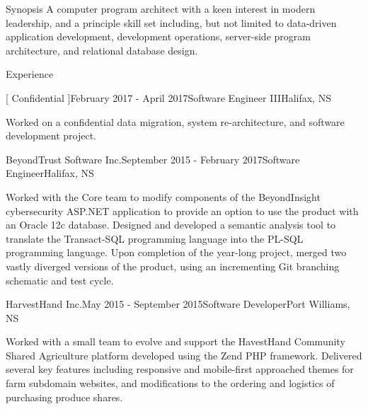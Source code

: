 \documentclass{resume} %
\begin{document}
\begin{rSection}{Synopsis}
A computer program architect with a keen interest in modern leadership, and a principle skill set
including, but not limited to data-driven application development, development operations, server-side
program architecture, and relational database design.
\end{rSection}



\begin{rSection}{Experience}


\begin{rSubsection}{[ Confidential ]}{February 2017 - April 2017}{Software Engineer III}{Halifax, NS}

\item[] Worked on a confidential data migration, system re-architecture, and software development project.

\end{rSubsection}


\begin{rSubsection}{BeyondTrust Software Inc.}{September 2015 - February 2017}{Software Engineer}{Halifax, NS}

\item[] Worked with the Core team to modify components of the BeyondInsight cybersecurity ASP.NET application to provide an option to use the product with an Oracle 12c database. Designed and developed a semantic analysis tool to translate the Transact-SQL programming language into the PL-SQL programming language. Upon completion of the year-long project, merged two vastly diverged versions of the product, using an incrementing Git branching schematic and test cycle.

\end{rSubsection}



\begin{rSubsection}{HarvestHand Inc.}{May 2015 - September 2015}{Software Developer}{Port Williams, NS}

\item[] Worked with a small team to evolve and support the HavestHand Community Shared Agriculture platform developed using the Zend PHP framework. Delivered several key features including responsive and mobile-first approached themes for farm subdomain websites, and modifications to the ordering and logistics of purchasing produce shares.


\end{rSubsection}
\end{rSection}
\end{document}
